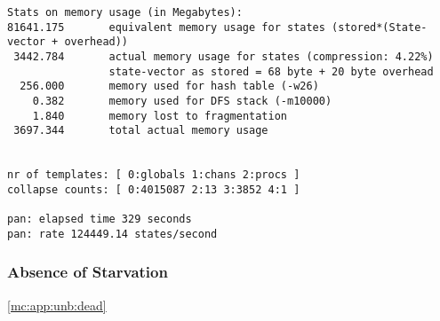 \documentclass{llncs}
\begin{document}
\begin{lstlisting}
Stats on memory usage (in Megabytes):
81641.175       equivalent memory usage for states (stored*(State-vector + overhead))
 3442.784       actual memory usage for states (compression: 4.22%)
                state-vector as stored = 68 byte + 20 byte overhead
  256.000       memory used for hash table (-w26)
    0.382       memory used for DFS stack (-m10000)
    1.840       memory lost to fragmentation
 3697.344       total actual memory usage


nr of templates: [ 0:globals 1:chans 2:procs ]
collapse counts: [ 0:4015087 2:13 3:3852 4:1 ]

pan: elapsed time 329 seconds
pan: rate 124449.14 states/second
\end{lstlisting}

\subsubsection{Absence of Starvation}
\ref{mc:app:unb:dead}
\end{document}
